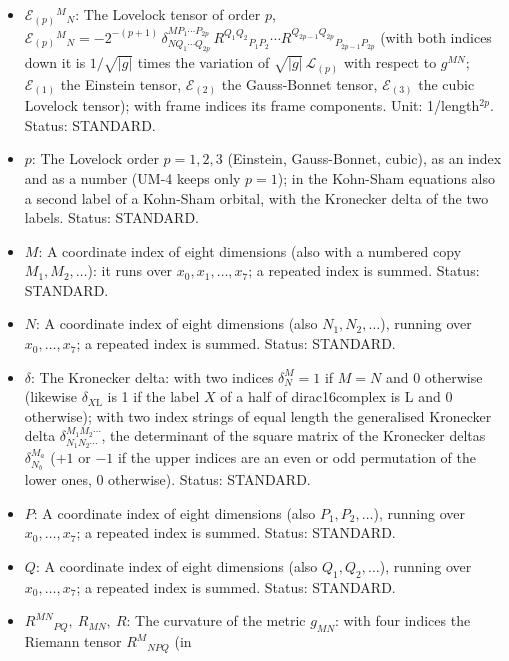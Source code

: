 \documentclass[
  10pt,
]{article}
\providecommand{\tightlist}{%
  \setlength{\itemsep}{0pt}\setlength{\parskip}{0pt}}
\begin{document}
\begin{itemize}
\tightlist
\item
  \(\mathcal{E}_{(p)}{}^M{}_N\): The Lovelock tensor of order \(p\),
  \(\mathcal{E}_{(p)}{}^M{}_N = -2^{-(p+1)}\,\delta^{MP_1\cdots P_{2p}}_{NQ_1\cdots Q_{2p}}\,R^{Q_1Q_2}{}_{P_1P_2}\cdots R^{Q_{2p-1}Q_{2p}}{}_{P_{2p-1}P_{2p}}\)
  (with both indices down it is \(1/\sqrt{\lvert g\rvert}\) times the
  variation of \(\sqrt{\lvert g\rvert}\,\mathcal{L}_{(p)}\) with respect
  to \(g^{MN}\); \(\mathcal{E}_{(1)}\) the Einstein tensor,
  \(\mathcal{E}_{(2)}\) the Gauss-Bonnet tensor, \(\mathcal{E}_{(3)}\)
  the cubic Lovelock tensor); with frame indices its frame components.
  Unit: 1/length\(^{2p}\). Status: STANDARD.
\item
  \(p\): The Lovelock order \(p = 1, 2, 3\) (Einstein, Gauss-Bonnet,
  cubic), as an index and as a number (UM-4 keeps only \(p = 1\)); in
  the Kohn-Sham equations also a second label of a Kohn-Sham orbital,
  with the Kronecker delta of the two labels. Status: STANDARD.
\item
  \(M\): A coordinate index of eight dimensions (also with a numbered
  copy \(M_1, M_2, \dots\)): it runs over \(x_0, x_1, \dots, x_7\); a
  repeated index is summed. Status: STANDARD.
\item
  \(N\): A coordinate index of eight dimensions (also
  \(N_1, N_2, \dots\)), running over \(x_0, \dots, x_7\); a repeated
  index is summed. Status: STANDARD.
\item
  \(\delta\): The Kronecker delta: with two indices \(\delta^M_N = 1\)
  if \(M = N\) and 0 otherwise (likewise \(\delta_{X\mathrm{L}}\) is 1
  if the label \(X\) of a half of dirac16complex is L and 0 otherwise);
  with two index strings of equal length the generalised Kronecker delta
  \(\delta^{M_1M_2\cdots}_{N_1N_2\cdots}\), the determinant of the
  square matrix of the Kronecker deltas \(\delta^{M_a}_{N_b}\) (\(+1\)
  or \(-1\) if the upper indices are an even or odd permutation of the
  lower ones, 0 otherwise). Status: STANDARD.
\item
  \(P\): A coordinate index of eight dimensions (also
  \(P_1, P_2, \dots\)), running over \(x_0, \dots, x_7\); a repeated
  index is summed. Status: STANDARD.
\item
  \(Q\): A coordinate index of eight dimensions (also
  \(Q_1, Q_2, \dots\)), running over \(x_0, \dots, x_7\); a repeated
  index is summed. Status: STANDARD.
\item
  \(R^{MN}{}_{PQ},\ R_{MN},\ R\): The curvature of the metric
  \(g_{MN}\): with four indices the Riemann tensor \(R^M{}_{NPQ}\) (in

\end{itemize}
\end{document}
